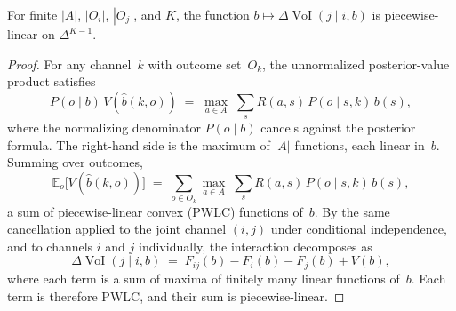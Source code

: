 \documentclass[10pt,a4paper]{amsart}
\newcommand{\E}{\mathbb{E}}
\newcommand{\VoI}{\operatorname{VoI}}
\newcommand{\bpost}{\hat{b}}
\begin{document}
\begin{theoremA}
\label{prop:polyhedral}
For finite $|A|$, $|O_i|$, $|O_j|$, and $K$, the function $b \mapsto \Delta\VoI(j \mid i, b)$ is piecewise-linear on $\Delta^{K-1}$.
\end{theoremA}

\begin{proof}
For any channel~$k$ with outcome set~$O_k$, the unnormalized posterior-value product satisfies
\[
  P(o \mid b)\, V(\bpost(k, o))
  \;=\; \max_{a \in A}\; \sum_s R(a,s)\, P(o \mid s, k)\, b(s),
\]
where the normalizing denominator $P(o \mid b)$ cancels against the posterior formula.
The right-hand side is the maximum of $|A|$ functions, each linear in~$b$.
Summing over outcomes,
\[
  \E_o\bigl[V(\bpost(k, o))\bigr]
  \;=\;
  \sum_{o \in O_k} \max_{a \in A}\; \sum_s R(a,s)\, P(o \mid s, k)\, b(s),
\]
a sum of piecewise-linear convex (PWLC) functions of~$b$.
By the same cancellation applied to the joint channel $(i,j)$ under conditional independence, and to channels $i$ and $j$ individually, the interaction decomposes as
\[
  \Delta\VoI(j \mid i, b)
  \;=\; F_{ij}(b) - F_i(b) - F_j(b) + V(b),
\]
where each term is a sum of maxima of finitely many linear functions of~$b$.
Each term is therefore PWLC, and their sum is piecewise-linear.
\end{proof}
\end{document}
